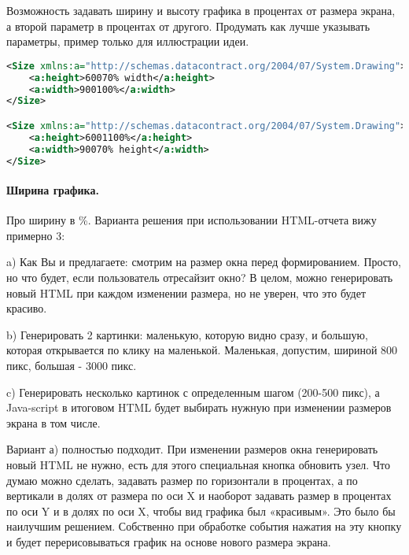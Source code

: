 \documentclass[10pt,a4paper]{article}
\begin{document}
Возможность задавать ширину и высоту графика в процентах от размера экрана, а
второй параметр в процентах от другого. Продумать как лучше указывать параметры,
пример только для иллюстрации идеи.

\begin{lstlisting}[language=XML,label=MSSQLServerAuditor.Parameters.xml,caption=MSSQLServerAuditor.Parameters.xml]
<Size xmlns:a="http://schemas.datacontract.org/2004/07/System.Drawing">
	<a:height>60070% width</a:height>
	<a:width>900100%</a:width>
</Size>

<Size xmlns:a="http://schemas.datacontract.org/2004/07/System.Drawing">
	<a:height>6001100%</a:height>
	<a:width>90070% height</a:width>
</Size>
\end{lstlisting}

\paragraph{Ширина графика.}

Про ширину в \%. Варианта решения при использовании HTML-отчета вижу примерно 3:

\begin{description}

	\item a) Как Вы и предлагаете: смотрим на размер окна перед формированием.
	Просто, но что будет, если пользователь отресайзит окно? В целом, можно
	генерировать новый HTML при каждом изменении размера, но не уверен, что это
	будет красиво.

	\item b) Генерировать 2 картинки: маленькую, которую видно сразу, и большую,
	которая открывается по клику на маленькой. Маленькая, допустим, шириной 800
	пикс, большая - 3000 пикс.

	\item c) Генерировать несколько картинок с определенным шагом (200-500
	пикс), а Java-script в итоговом HTML будет выбирать нужную при изменении
	размеров экрана в том числе.

\end{description}

Вариант а) полностью подходит. При изменении размеров окна генерировать новый
HTML не нужно, есть для этого специальная кнопка обновить узел. Что думаю можно
сделать, задавать размер по горизонтали в процентах, а по вертикали в долях от
размера по оси X и наоборот задавать размер в процентах по оси Y и в долях по
оси X, чтобы вид графика был «красивым». Это было бы наилучшим решением.
Собственно при обработке события нажатия на эту кнопку и будет перерисовываться
график на основе нового размера экрана.
\end{document}
